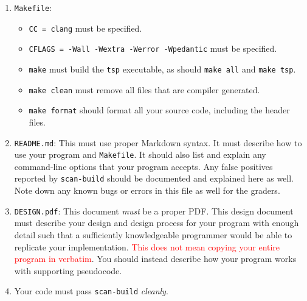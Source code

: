 \begin{enumerate}
  \item \texttt{Makefile}:
    \begin{itemize}
      \item \texttt{CC = clang} must be specified.
      \item \texttt{CFLAGS = -Wall -Wextra -Werror -Wpedantic} must be specified.
      \item \texttt{make} must build the \texttt{tsp}
        executable, as should \texttt{make all} and \texttt{make
        tsp}.
      \item \texttt{make clean} must remove all files that are compiler
        generated.
      \item \texttt{make format} should format all your source code,
        including the header files.
    \end{itemize}
  \item \texttt{README.md}: This must use proper Markdown syntax. It
    must describe how to use your program and \texttt{Makefile}. It
    should also list and explain any command-line options that your
    program accepts. Any false positives reported by \texttt{scan-build}
    should be documented and explained here as well. Note down any known
    bugs or errors in this file as well for the graders.
  \item \texttt{DESIGN.pdf}: This document \emph{must} be a proper
    PDF\@. This design document must describe your design and design
    process for your program with enough detail such that a sufficiently
    knowledgeable programmer would be able to replicate your
    implementation. \textcolor{red}{This does not mean copying your
    entire program in verbatim}. You should instead describe how your
    program works with supporting pseudocode.
  \item Your code must pass \texttt{scan-build} \emph{cleanly}.
\end{enumerate}
